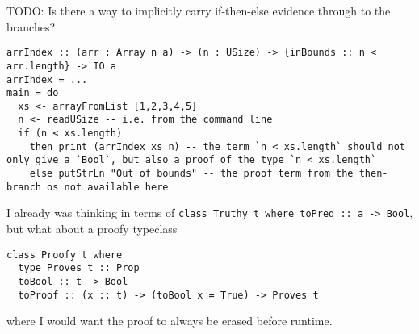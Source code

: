 \documentclass[11pt]{article} %
\theoremstyle{definition}
\theoremstyle{remark}
\begin{document}
TODO:
Is there a way to implicitly carry if-then-else evidence through to the branches?
\begin{verbatim}
arrIndex :: (arr : Array n a) -> (n : USize) -> {inBounds :: n < arr.length} -> IO a
arrIndex = ...
main = do
  xs <- arrayFromList [1,2,3,4,5]
  n <- readUSize -- i.e. from the command line
  if (n < xs.length)
    then print (arrIndex xs n) -- the term `n < xs.length` should not only give a `Bool`, but also a proof of the type `n < xs.length`
    else putStrLn "Out of bounds" -- the proof term from the then-branch os not available here
\end{verbatim}
I already was thinking in terms of \verb!class Truthy t where toPred :: a -> Bool!, but what about a proofy typeclass
\begin{verbatim}
class Proofy t where
  type Proves t :: Prop
  toBool :: t -> Bool
  toProof :: (x :: t) -> (toBool x = True) -> Proves t

\end{verbatim}
where I would want the proof to always be erased before runtime.

\printbibliography
\end{document}
